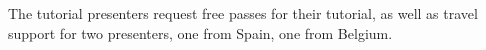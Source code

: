 The tutorial presenters request free passes for their tutorial,
as well as travel support for two presenters, one from Spain, one from Belgium.
